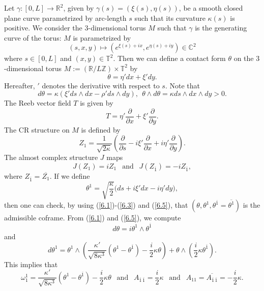 \documentclass{amsart}
\theoremstyle{Corollary}
\numberwithin{equation}{section}
\begin{document}
Let $\gamma:[0,L]\to\mathbb{R}^2$, 
given by 
$\gamma(s)=(\xi(s),\eta(s))$, 
be a smooth closed plane curve parametrized 
by arc-length $s$ such that 
its curvature $\kappa(s)$ is positive. 
We consider the $3$-dimensional torus $M$
such that $\gamma$ is the generating curve of the torus: 
$M$ is parametrized by 
$$(s,x,y)\mapsto(e^{\xi(s)+ix},e^{\eta(s)+iy})\in \mathbb{C}^2$$
where $s\in [0,L]$ and $(x,y)\in\mathbb{T}^2$.  
Then we can define 
a contact form $\theta$ on 
the $3$-dimensional torus
$M:=(\mathbb{R}/L\mathbb{Z})\times\mathbb{T}^2$
by 
\begin{equation}\label{6.1}
\theta=\eta' dx+\xi'dy.
\end{equation}
Hereafter, $'$ denotes the derivative with respect to $s$.
Note that 
$$d\theta=\kappa(\xi'ds\wedge dx-\rho' ds\wedge dy),~~
\theta\wedge d\theta=\kappa ds\wedge dx\wedge dy>0.$$
The Reeb vector field $T$ is given by 
\begin{equation}\label{6.2}
T=\eta'\frac{\partial}{\partial x}+\xi'\frac{\partial}{\partial y}.
\end{equation}
The CR structure on $M$ is defined by 
\begin{equation}\label{6.3}
Z_1=\frac{1}{\sqrt{2\kappa}}
\left(\frac{\partial}{\partial s}-i\xi'\frac{\partial}{\partial x}+i\eta'\frac{\partial}{\partial y}\right).
\end{equation}
The almost complex structure $J$ maps 
\begin{equation}\label{6.4}
J(Z_1)=iZ_1~~\mbox{ and }~~J(Z_{\overline{1}})=-iZ_{\overline{1}}, 
\end{equation}
where $Z_{\overline{1}}=\overline{Z_1}$.
If we define 
\begin{equation}\label{6.5}
\theta^1=\sqrt{\frac{\kappa}{2}}
\big(ds+i\xi'dx-i\eta'dy\big),
\end{equation}
then one can check, by using 
(\ref{6.1})-(\ref{6.3}) and (\ref{6.5}), 
that 
 $(\theta,\theta^1,\theta^{\overline{1}}=\overline{\theta^1})$
is the admissible coframe.
From (\ref{6.1}) and (\ref{6.5}), we compute
\begin{equation}\label{6.11}
d\theta=i\theta^1\wedge \theta^{\overline{1}}
\end{equation}
and 
\begin{equation*}
d\theta^1
=\theta^1\wedge\left(\frac{\kappa'}{\sqrt{8\kappa^3}}
(\theta^1-\theta^{\overline{1}})-\frac{i}{2}\kappa\theta\right)
+\theta\wedge\left(\frac{i}{2}\kappa\theta^{\overline{1}}\right).
\end{equation*}
This implies that 
\begin{equation}\label{6.6}
\omega_1^1=\frac{\kappa'}{\sqrt{8\kappa^3}}
(\theta^1-\theta^{\overline{1}})-\frac{i}{2}\kappa\theta
~~\mbox{ and }~~
A_{\overline{1}\,\overline{1}}=\frac{i}{2}\kappa 
~~\mbox{ and }~~
A_{11}=\overline{A_{\overline{1}\,\overline{1}}}
=-\frac{i}{2}\kappa.
\end{equation}
\end{document}
